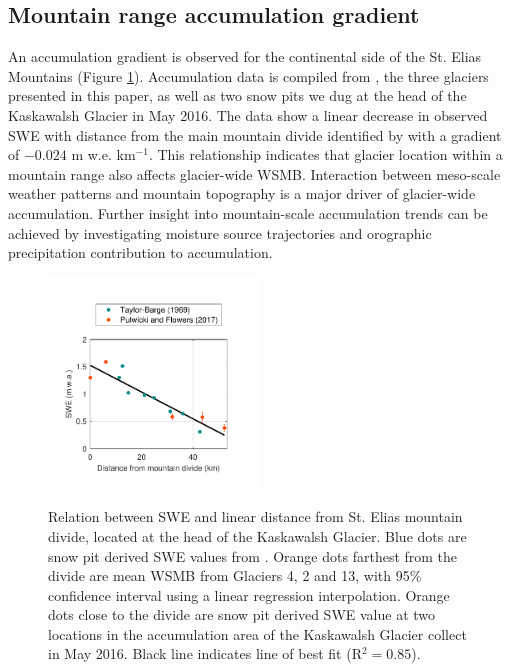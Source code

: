 \documentclass[twocolumn,letterpaper]{igs}
\begin{document}
\subsection{Mountain range accumulation gradient}

An accumulation gradient is observed for the continental side of the St. Elias Mountains (Figure \ref{fig:AccumGrad}). Accumulation data is compiled from \cite{Taylor1969}, the three glaciers presented in this paper, as well as two snow pits we dug at the head of the Kaskawalsh Glacier in May 2016. The data show a linear decrease in observed SWE with distance from the main mountain divide identified by \citep{Taylor1969} with a gradient of $-0.024$ m w.e. km$^{-1}$. This relationship indicates that glacier location within a mountain range also affects glacier-wide WSMB. Interaction between meso-scale weather patterns and mountain topography is a major driver of glacier-wide accumulation. Further insight into mountain-scale accumulation trends can be achieved by investigating moisture source trajectories and orographic precipitation contribution to accumulation. 


\begin{figure}
	\centering
	\includegraphics[width =0.5\textwidth]{AccumGrad.pdf}\\
	\caption{Relation between SWE and linear distance from St. Elias mountain divide, located at the head of the Kaskawalsh Glacier. Blue dots are snow pit derived SWE values from \citep{Taylor1969}. Orange dots farthest from the divide are mean WSMB from Glaciers 4, 2 and 13, with 95\% confidence interval using a linear regression interpolation. Orange dots close to the divide are snow pit derived SWE value at two locations in the accumulation area of the Kaskawalsh Glacier collect in May 2016. Black line indicates line of best fit (R$^2=0.85$).}
	\label{fig:AccumGrad}
\end{figure}
\end{document}
